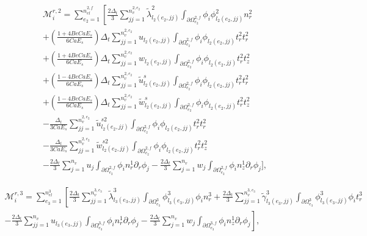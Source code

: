 \documentclass{article}
\begin{document}
\begin{equation}
\begin{array}{l} \mathcal{M}_i^{r,2} = \sum_{e_2=1}^{n_{el}^{2,f}} \left[ \frac{2\Delta_t}{3} \sum_{jj=1}^{n_v^{2,e_2}} \tilde{\lambda}_{l_2(e_2,jj)}^2 \int_{\partial \Omega_{e_2}^{2,f}} \phi_i \phi_{l_2(e_2,jj)}^2 n_r^2 \right. \\ + \left( \frac{1 + 4Be Ca E_s}{6Ca E_s} \right) \Delta_t \sum_{jj=1}^{n_v^{2,e_2}} u_{l_2(e_2,jj)} \int_{\partial \Omega_{e_2}^{2,f}} \phi_i \phi_{l_2(e_2,jj)} t_r^2 t_r^2 \\ + \left( \frac{1 + 4Be Ca E_s}{6Ca E_s} \right) \Delta_t \sum_{jj=1}^{n_v^{2,e_2}} w_{l_2(e_2,jj)} \int_{\partial \Omega_{e_2}^{2,f}} \phi_i \phi_{l_2(e_2,jj)} t_r^2 t_z^2 \\ + \left( \frac{1 - 4Be Ca E_s}{6Ca E_s} \right) \Delta_t \sum_{jj=1}^{n_v^{2,e_2}} \tilde{u}_{l_2(e_2,jj)}^s \int_{\partial \Omega_{e_2}^{2,f}} \phi_i \phi_{l_2(e_2,jj)} t_r^2 t_r^2 \\ + \left( \frac{1 - 4Be Ca E_s}{6Ca E_s} \right) \Delta_t \sum_{jj=1}^{n_v^{2,e_2}} \tilde{w}_{l_2(e_2,jj)}^s \int_{\partial \Omega_{e_2}^{2,f}} \phi_i \phi_{l_2(e_2,jj)} t_r^2 t_z^2 \\ - \frac{\Delta_t}{3Ca E_s} \sum_{jj=1}^{n_v^{2,e_2}} \tilde{u}_{l_2(e_2,jj)}^{s2} \int_{\partial \Omega_{e_2}^{2,f}} \phi_i \phi_{l_2(e_2,jj)} t_r^2 t_r^2 \\ - \frac{\Delta_t}{3Ca E_s} \sum_{jj=1}^{n_v^{2,e_2}} \tilde{w}_{l_2(e_2,jj)}^{s2} \int_{\partial \Omega_{e_2}^{2,f}} \phi_i \phi_{l_2(e_2,jj)} t_r^2 t_z^2 \\ - \frac{2\Delta_t}{3} \sum_{j=1}^{n_v} u_j \int_{\partial \Omega_{e_2}^{2,f}} \phi_i n_r^1 \partial_r \phi_j - \frac{2\Delta_t}{3} \sum_{j=1}^{n_v} w_j \int_{\partial \Omega_{e_2}^{2,f}} \phi_i n_z^1 \partial_r \phi_j \Bigg], \end{array} \tag{4.111}
\end{equation}

\begin{equation}
\begin{array}{l} \mathcal{M}_i^{r,3} = \sum_{e_3=1}^{n_{el}^{3}} \left[ \frac{2\Delta_t}{3} \sum_{jj=1}^{n_v^{3,e_3}} \tilde{\lambda}_{l_3(e_3,jj)}^3 \int_{\partial \Omega_{e_3}^{3}} \phi_{l_3(e_3,jj)}^3 \phi_i n_r^3 + \frac{2\Delta_t}{3} \sum_{jj=1}^{n_v^{3,e_3}} \tilde{\gamma}_{l_3(e_3,jj)}^3 \int_{\partial \Omega_{e_3}^{3}} \phi_{l_3(e_3,jj)}^3 \phi_i t_r^3 \right. \\ \left. - \frac{2\Delta_t}{3} \sum_{jj=1}^{n_v} u_{l_3(e_3,jj)} \int_{\partial \Omega_{e_3}^{3,f}} \phi_i n_r^1 \partial_r \phi_j - \frac{2\Delta_t}{3} \sum_{j=1}^{n_v} w_j \int_{\partial \Omega_{e_3}^{3,f}} \phi_i n_z^1 \partial_r \phi_j \right], \end{array} \tag{4.112}
\end{equation}
\end{document}
